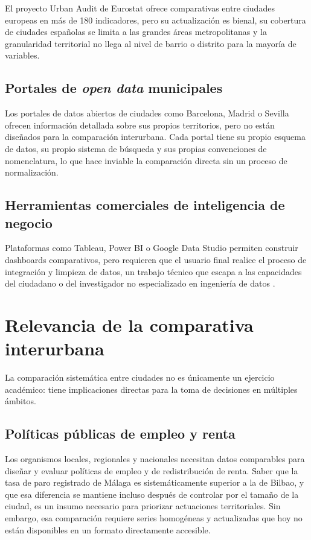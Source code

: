 El proyecto Urban Audit de Eurostat \parencite{Eurostat2023UrbanAudit} ofrece comparativas entre ciudades europeas en más de 180 indicadores, pero su actualización es bienal, su cobertura de ciudades españolas se limita a las grandes áreas metropolitanas y la granularidad territorial no llega al nivel de barrio o distrito para la mayoría de variables.

\subsection{Portales de \textit{open data} municipales}

Los portales de datos abiertos de ciudades como Barcelona, Madrid o Sevilla ofrecen información detallada sobre sus propios territorios, pero no están diseñados para la comparación interurbana. Cada portal tiene su propio esquema de datos, su propio sistema de búsqueda y sus propias convenciones de nomenclatura, lo que hace inviable la comparación directa sin un proceso de normalización.

\subsection{Herramientas comerciales de inteligencia de negocio}

Plataformas como Tableau, Power BI o Google Data Studio permiten construir dashboards comparativos, pero requieren que el usuario final realice el proceso de integración y limpieza de datos, un trabajo técnico que escapa a las capacidades del ciudadano o del investigador no especializado en ingeniería de datos \parencite{Davenport2012BigData}.

\section{Relevancia de la comparativa interurbana}

La comparación sistemática entre ciudades no es únicamente un ejercicio académico: tiene implicaciones directas para la toma de decisiones en múltiples ámbitos.

\subsection{Políticas públicas de empleo y renta}

Los organismos locales, regionales y nacionales necesitan datos comparables para diseñar y evaluar políticas de empleo y de redistribución de renta. Saber que la tasa de paro registrado de Málaga es sistemáticamente superior a la de Bilbao, y que esa diferencia se mantiene incluso después de controlar por el tamaño de la ciudad, es un insumo necesario para priorizar actuaciones territoriales. Sin embargo, esa comparación requiere series homogéneas y actualizadas que hoy no están disponibles en un formato directamente accesible.

